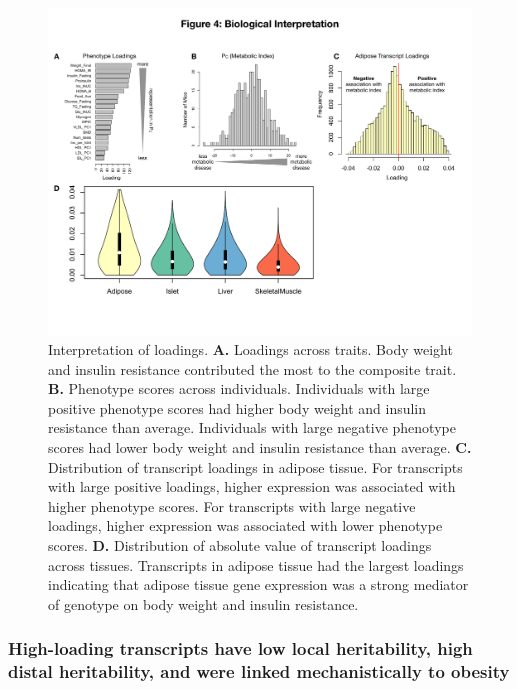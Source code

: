 \documentclass[
]{article}
\begin{document}
\begin{figure}[ht!]
\includegraphics[width=\textwidth]{Figures/Fig4_interpretation.pdf} 
\caption{Interpretation of loadings. \textbf{A.} Loadings 
across traits. Body weight and insulin resistance contributed 
the most to the composite trait. \textbf{B.} Phenotype scores 
across individuals. Individuals with large positive phenotype 
scores had higher body weight and insulin resistance than average. 
Individuals with large negative phenotype scores had lower body 
weight and insulin resistance than average. \textbf{C.} 
Distribution of transcript loadings in adipose tissue. For 
transcripts with large positive loadings, higher expression was 
associated with higher phenotype scores. For transcripts with 
large negative loadings, higher expression was associated with 
lower phenotype scores. \textbf{D.} Distribution of absolute 
value of transcript loadings across tissues. Transcripts in 
adipose tissue had the largest loadings indicating that 
adipose tissue gene expression was a strong mediator of 
genotype on body weight and insulin resistance.
}
\label{fig:interpretation}
\end{figure}

\subsubsection{High-loading transcripts have low local heritability,
high distal heritability, and were linked mechanistically to
obesity}\label{high-loading-transcripts-have-low-local-heritability-high-distal-heritability-and-were-linked-mechanistically-to-obesity}
\end{document}
